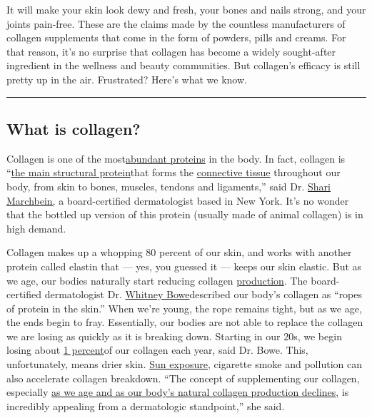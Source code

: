 It will make your skin look dewy and fresh, your bones and nails strong,
and your joints pain-free. These are the claims made by the countless
manufacturers of collagen supplements that come in the form of powders,
pills and creams. For that reason, it's no surprise that collagen has
become a widely sought-after ingredient in the wellness and beauty
communities. But collagen's efficacy is still pretty up in the air.
Frustrated? Here's what we know.

\begin{center}\rule{0.5\linewidth}{\linethickness}\end{center}

\hypertarget{what-is-collagen}{%
\subsection{What is collagen?}\label{what-is-collagen}}

Collagen is one of the
most\href{https://www.ncbi.nlm.nih.gov/pmc/articles/PMC2846778/}{abundant
proteins} in the body. In fact, collagen is
``\href{https://pdfs.semanticscholar.org/6667/18c2d1ec539560350877bfe8212ba37ee2ae.pdf?_ga=2.110665990.264799597.1571862250-1979460952.1571862250}{the
main structural protein}that forms the
\href{https://www.ncbi.nlm.nih.gov/books/NBK21582/}{connective tissue}
throughout our body, from skin to bones, muscles, tendons and
ligaments,'' said Dr. \href{https://drsharimarchbein.com/}{Shari
Marchbein,} a board-certified dermatologist based in New York. It's no
wonder that the bottled up version of this protein (usually made of
animal collagen) is in high demand.

Collagen makes up a whopping 80 percent of our skin, and works with
another protein called elastin that --- yes, you guessed it --- keeps
our skin elastic. But as we age, our bodies naturally start reducing
collagen
\href{https://www.ncbi.nlm.nih.gov/pmc/articles/PMC1606623/}{production}.
The board-certified dermatologist Dr.
\href{https://drwhitneybowe.com/}{Whitney Bowe}described our body's
collagen as ``ropes of protein in the skin.'' When we're young, the rope
remains tight, but as we age, the ends begin to fray. Essentially, our
bodies are not able to replace the collagen we are losing as quickly as
it is breaking down. Starting in our 20s, we begin losing about
\href{https://www.ncbi.nlm.nih.gov/pmc/articles/PMC3583892/}{1
percent}of our collagen each year, said Dr. Bowe. This, unfortunately,
means drier skin.
\href{https://core.ac.uk/download/pdf/81940824.pdf}{Sun exposure,}
cigarette smoke and pollution can also accelerate collagen breakdown.
``The concept of supplementing our collagen, especially
\href{https://www.ncbi.nlm.nih.gov/pmc/articles/PMC1606623/}{as we age
and as our body's natural collagen production declines}, is incredibly
appealing from a dermatologic standpoint,'' she said.

